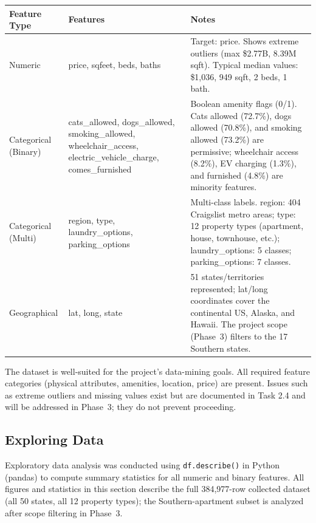 \begin{table}
    \centering
    \begin{tabular}{||p{2.2cm}|p{5.8cm}|p{6.9cm}||}
    \hline
    \hline
        Feature Type & Features & Notes \\
        \hline
        \hline
        Numeric & price, sqfeet, beds, baths & Target: price. Shows extreme outliers (max \$2.77B, 8.39M sqft). Typical median values: \$1,036, 949 sqft, 2 beds, 1 bath. \\
        \hline
        Categorical (Binary) & cats\_allowed, dogs\_allowed, smoking\_allowed, wheelchair\_access, electric\_vehicle\_charge, comes\_furnished & Boolean amenity flags (0/1). Cats allowed (72.7\%), dogs allowed (70.8\%), and smoking allowed (73.2\%) are permissive; wheelchair access (8.2\%), EV charging (1.3\%), and furnished (4.8\%) are minority features. \\
        \hline
        Categorical (Multi) & region, type, laundry\_options, parking\_options & Multi-class labels. region: 404 Craigslist metro areas; type: 12 property types (apartment, house, townhouse, etc.); laundry\_options: 5 classes; parking\_options: 7 classes. \\
        \hline
        Geographical & lat, long, state & 51 states/territories represented; lat/long coordinates cover the continental US, Alaska, and Hawaii. The project scope (Phase~3) filters to the 17 Southern states. \\
        \hline
    \end{tabular}
\end{table}

\noindent
The dataset is well-suited for the project's data-mining goals. All required feature categories (physical attributes, amenities, location, price) are present. Issues such as extreme outliers and missing values exist but are documented in Task 2.4 and will be addressed in Phase~3; they do not prevent proceeding.

\subsection{Exploring Data}
\noindent
Exploratory data analysis was conducted using \texttt{df.describe()} in Python (pandas) to compute summary statistics for all numeric and binary features. All figures and statistics in this section describe the full 384,977-row collected dataset (all 50 states, all 12 property types); the Southern-apartment subset is analyzed after scope filtering in Phase~3.

